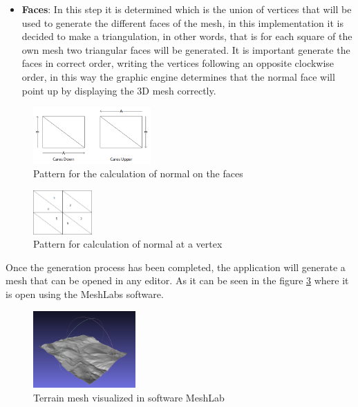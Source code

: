 \documentclass[10pt,a4paper,twocolumn,twoside]{article}
\begin{document}
\begin{itemize}
  \item \textbf{Faces}: In this step it is determined which is the union of vertices that will be used to generate the different faces of the mesh, in this implementation it is decided to make a triangulation, in other words, that is for each square of the own mesh two triangular faces will be generated. It is important generate the faces in correct order, writing the vertices following an opposite clockwise order, in this way the graphic engine determines that the normal face will point up by displaying the 3D mesh correctly.
\end{itemize}



\begin{figure}[!h]
\centering
  	\includegraphics[width=0.4\textwidth]{caranormal}
	\caption{Pattern for the calculation of normal on the faces}
	\label{fig-normalcara}
\end{figure}

\begin{figure}[!h]
\centering
  	\includegraphics[width=0.2\textwidth]{vertexnormal}
	\caption{Pattern for calculation of normal at a vertex}
	\label{fig-normalvertex}
\end{figure}

Once the generation process has been completed, the application will generate a mesh that can be opened in any editor. As it can be seen in the figure \ref{fig-meshlab} where it is open using the MeshLabs software.

\begin{figure}[!h]
\centering
  	\includegraphics[width=0.35\textwidth]{mesh_example_meshlab}
	\caption{Terrain mesh visualized in software MeshLab}
	\label{fig-meshlab}
\end{figure}
\end{document}
